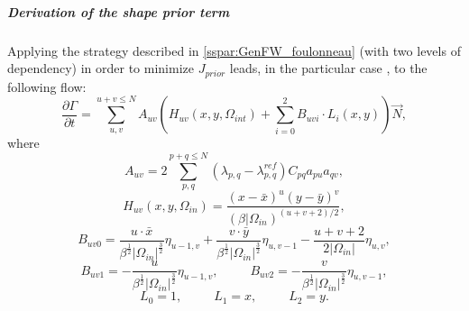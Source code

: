 \subparagraph{Derivation of the shape prior term} Applying the strategy described in \ref{sspar:GenFW_foulonneau} (with two levels of dependency) in order to minimize $J_{prior}$ leads, in the particular case , to the following flow:
\begin{equation}
  \label{eq:dphidt-foulonneau}
  \frac{\partial \Gamma}{\partial t} = \sum_{u,v}^{u+v\leq N} {A_{uv} \left( H_{uv}(x,y,\Omega_{int}) + \sum_{i=0}^2 { B_{uvi} \cdot L_i(x,y) } \right) } \vec{N},
\end{equation}
where
\begin{equation}
  \label{eq:Auv-foulonneau}
  A_{uv} = 2 \sum_{p,q}^{p+q\leq N} { \left( \lambda_{p,q} - \lambda_{p,q}^{ref} \right) C_{pq} a_{pu} a_{qv} },
\end{equation}
\begin{equation}
  \label{eq:Huv-foulonneau}
  H_{uv}(x,y,\Omega_{in}) = \frac{(x - \bar x)^u(y - \bar y)^v}{(\beta |\Omega_{in})^{(u+v+2)/2} },
\end{equation}
\begin{equation}
  \label{eq:Buv0-foulonneau}
  B_{uv0} = \frac{u \cdot \bar x}{\beta^\frac{1}{2} |\Omega_{in}|^\frac{3}{2}} \eta_{u-1,v} + \frac{v \cdot \bar y}{\beta^\frac{1}{2} |\Omega_{in}|^\frac{3}{2}} \eta_{u,v-1} - \frac{u + v + 2}{2|\Omega_{in}|} \eta_{u,v},
\end{equation}
\begin{equation}
  \label{eq:Buv1-2-foulonneau}
  B_{uv1} = -\frac{u}{\beta^\frac{1}{2} |\Omega_{in}|^\frac{3}{2}} \eta_{u-1,v}, \, \, \, \, \, \, \, \, \, \, \, \, \, \, \,
  B_{uv2} = -\frac{v}{\beta^\frac{1}{2} |\Omega_{in}|^\frac{3}{2}} \eta_{u,v-1},
\end{equation}
\begin{equation}
  \label{eq:L0-1-2-foulonneau}
  L_0 = 1, \, \, \, \, \, \, \, \, \, \, \, \, \, \, \,
  L_1 = x, \, \, \, \, \, \, \, \, \, \, \, \, \, \, \,
  L_2 = y.
\end{equation}